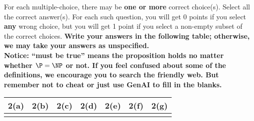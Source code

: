 For each multiple-choice, there may be \textbf{one or more} correct choice(s). Select all the correct answer(s). For each such question, you will get 0 points if you select \textbf{any} wrong choice, but you will get 1 point if you select a non-empty subset of the correct choices.
\textbf{Write your answers in the following table; otherwise, we may take your answers as unspecified.}\\
\textbf{Notice: ``must be true'' means the proposition holds no matter whether $\P = \NP$ or not. If you feel confused about some of the definitions, we encourage you to search the friendly web. But remember not to cheat or just use GenAI to fill in the blanks.}


\begin{table}[htbp]
    \centering
    \begin{tabular}{|p{1.5cm}|p{1.5cm}|p{1.5cm}|p{1.5cm}|p{1.5cm}|p{1.5cm}|p{1.5cm}|}
        \hline
        2(a) & 2(b) & 2(c) & 2(d) & 2(e) & 2(f) & 2(g) \\
        \hline
          &   &   &   &   &   &  \\
        \hline
    \end{tabular}
\end{table}

